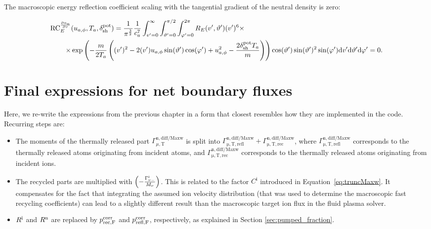 The macroscopic energy reflection coefficient scaling with the tangential gradient of the neutral density is zero:

\begin{align}
    \mathrm{RC}_{E}^{\frac{\partial n_\mathrm{n}}{\partial \tau}} & (u_{a,\phi},T_a,\delta_{\mathrm{sh}}^{\mathrm{pot}}) =
    \frac{1}{\pi^\frac{3}{2}} \frac{1}{c_a^7} \int_{v'=0}^{\infty} \int_{\vartheta'=0}^{\pi/2} \int_{\varphi'=0}^{2\pi}
    R_E(v',\vartheta') (v')^6 \times \nonumber \\
    \times & \exp \left( - \frac{m}{2 T_a} \left( (v')^2-2 (v') u_{a,\phi} \sin (\vartheta') \cos (\varphi') + u_{a,\phi}^2 - \frac{2 \delta_{\mathrm{sh}}^{\mathrm{pot}} T_a}{m} \right) \right) \cos (\vartheta') \sin (\vartheta')^2 \sin (\varphi')
    \mathrm{d} v' \mathrm{d} \vartheta' \mathrm{d} \varphi' = 0.
\end{align}

\section{Final expressions for net boundary fluxes}

Here, we re-write the expressions from the previous chapter in a form that closest resembles how they are implemented in the code. Recurring steps are:

\begin{itemize}
    \item The moments of the thermally released part $\Gamma_{\mu,\mathrm{T}}^{\mathrm{n,diff/Maxw}}$ is split into $\Gamma_{\mathrm{\mu,T,refl}}^{\mathrm{n,diff/Maxw}} + \Gamma_{\mathrm{\mu,T,rec}}^{\mathrm{n,diff/Maxw}}$, where $\Gamma_{\mathrm{\mu,T,refl}}^{\mathrm{n,diff/Maxw}}$ corresponds to the thermally released atoms originating from incident atoms, and $\Gamma_{\mathrm{\mu,T,rec}}^{\mathrm{n,diff/Maxw}}$ corresponds to the thermally released atoms originating from incident ions.
    \item The recycled parts are multiplied with $\left( - \frac{\Gamma^{\mathrm{i}}_{\nu-}}{M_\nu} \right)$. This is related to the factor $C^{\mathrm{i}}$ introduced in Equation~\eqref{eq:truncMaxw}. It compensates for the fact that integrating the assumed ion velocity distribution (that was used to determine the macroscopic fast recycling coefficients) can lead to a slightly different result than the macroscopic target ion flux in the fluid plasma solver.
    \item $R^{\mathrm{i}}$ and $R^{\mathrm{n}}$ are replaced by $p_{\mathrm{rec,F}}^{\mathrm{corr}}$ and $p_{\mathrm{refl,F}}^{\mathrm{corr}}$, respectively, as explained in Section \ref{sec:pumped_fraction}.
\end{itemize}

